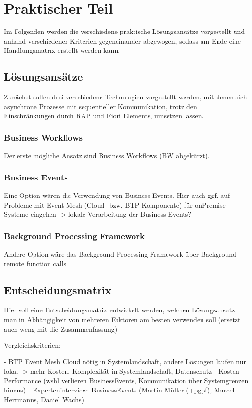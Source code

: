 \chapter{Praktischer Teil}

Im Folgenden werden die verschiedene praktische Lösungsansätze vorgestellt und anhand verschiedener Kriterien gegeneinander abgewogen, sodass am Ende eine Handlungsmatrix erstellt werden kann.

\section{Lösungsansätze}

Zunächst sollen drei verschiedene Technologien vorgestellt werden, mit denen sich asynchrone Prozesse mit sequentieller Kommunikation, trotz den Einschränkungen durch RAP und Fiori Elements, umsetzen lassen.

\subsection{Business Workflows}

Der erste mögliche Ansatz sind Business Workflows (BW abgekürzt).

\subsection{Business Events}

Eine Option wären die Verwendung von Business Events. Hier auch ggf. auf Probleme mit Event-Mesh (Cloud- bzw. BTP-Komponente) für onPremise-Systeme eingehen -> lokale Verarbeitung der Business Events?

\subsection{Background Processing Framework}

Andere Option wäre das Background Processing Framework über Background remote function calls.

\section{Entscheidungsmatrix}

Hier soll eine Entscheidungsmatrix entwickelt werden, welchen Lösungsansatz man in Abhängigkeit von mehreren Faktoren am besten verwenden soll (ersetzt auch weng mit die Zusammenfassung)

Vergleichskriterien:

- BTP Event Mesh Cloud nötig in Systemlandschaft, andere Lösungen laufen nur lokal -> mehr Kosten,  Komplexität in Systemlandschaft, Datenschutz
- Kosten
- Performance (wshl verlieren BusinessEvents, Kommunikation über Systemgrenzen hinaus)
- Experteninterview: BusinessEvents (Martin Müller (+pgpf), Marcel Herrmanns, Daniel Wachs) 